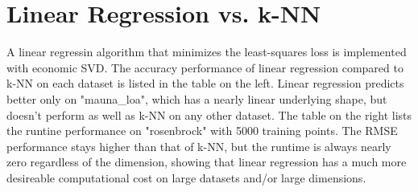 \documentclass{article} %
\begin{document}
\vspace{0.4cm}
\section*{Linear Regression vs. k-NN} %
A linear regressin algorithm that minimizes the least-squares loss is implemented with economic SVD. The accuracy performance of linear regression compared to k-NN on each dataset is listed in the table on the left. Linear regression predicts better only on "mauna\_loa", which has a nearly linear underlying shape, but doesn't perform as well as k-NN on any other dataset. The table on the right lists the runtine performance on "rosenbrock" with 5000 training points. The RMSE performance stays higher than that of k-NN, but the runtime is always nearly zero regardless of the dimension, showing that linear regression has a much more desireable computational cost on large datasets and/or large dimensions.
\end{document}
